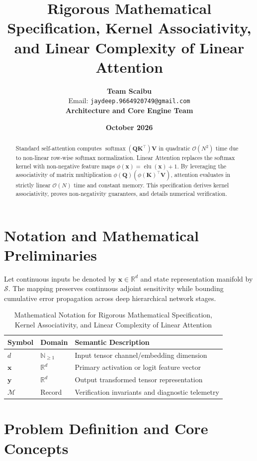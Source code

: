 \documentclass[11pt,a4paper]{article}
\title{\textbf{Rigorous Mathematical Specification, Kernel Associativity, and Linear Complexity of Linear Attention}}
\author{\textbf{Team Scaibu} \\ \small Email: \texttt{jaydeep.9664920749@gmail.com} \\ \small \textbf{Architecture and Core Engine Team}}
\date{\textbf{October 2026}}
\theoremstyle{definition}
\begin{document}
\maketitle

\begin{abstract}
Standard self-attention computes $\operatorname{softmax}(\mathbf{Q}\mathbf{K}^\top)\mathbf{V}$ in quadratic $\mathcal{O}(N^2)$ time due to non-linear row-wise softmax normalization. Linear Attention replaces the softmax kernel with non-negative feature maps $\phi(\mathbf{x}) = \operatorname{elu}(\mathbf{x}) + 1$. By leveraging the associativity of matrix multiplication $\phi(\mathbf{Q})(\phi(\mathbf{K})^\top \mathbf{V})$, attention evaluates in strictly linear $\mathcal{O}(N)$ time and constant memory. This specification derives kernel associativity, proves non-negativity guarantees, and details numerical verification.
\end{abstract}

\section{Notation and Mathematical Preliminaries}

Let continuous inputs be denoted by $\mathbf{x} \in \mathbb{R}^d$ and state representation manifold by $\mathcal{S}$. The mapping preserves continuous adjoint sensitivity while bounding cumulative error propagation across deep hierarchical network stages.

\begin{table}[h]
\centering
\caption{Mathematical Notation for Rigorous Mathematical Specification, Kernel Associativity, and Linear Complexity of Linear Attention}
\begin{tabular}{lll}
\toprule
\textbf{Symbol} & \textbf{Domain} & \textbf{Semantic Description} \\
\midrule
$d$ & $\mathbb{N}_{\ge 1}$ & Input tensor channel/embedding dimension \\
$\mathbf{x}$ & $\mathbb{R}^d$ & Primary activation or logit feature vector \\
$\mathbf{y}$ & $\mathbb{R}^d$ & Output transformed tensor representation \\
$\mathcal{M}$ & Record & Verification invariants and diagnostic telemetry \\
\bottomrule
\end{tabular}
\end{table}

\section{Problem Definition and Core Concepts}
\end{document}
